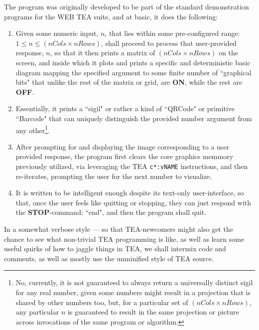 \documentclass[a4paper, 18pt]{book} %
\begin{document}
The program was originally developed to be part of the standard demonstration programs for the WEB TEA suite, and at basic, it does the following:

\begin{enumerate}
\item Given some numeric input, $n$, that lies within some pre-configured range: $1 \leq n \leq (nCols \times nRows)$, shall proceed to process that user-provided response, $n$, so that it then prints a matrix of $(nCols \times nRows)$ on the screen, and inside which it plots and prints a specific and deterministic basic diagram mapping the specified argument to some finite number of ``graphical bits" that unlike the rest of the matrix or grid, are \textbf{ON}, while the rest are \textbf{OFF}.
\item Essentially, it prints a ``sigil" or rather a kind of ``QRCode" or primitive ``Barcode" that can uniquely distinguish the provided number argument from any other\footnote{No, currently, it is not guaranteed to always return a universally distinct sigil for any real number, given some  numbers might result in a projection that is shared by other numbers too, but, for a particular set of $(nCols \times nRows)$, any particular $n$ is guaranteed to result in the same projection or picture across invocations of the same program or algorithm.}.
\item After prompting for and displaying the image corresponding to a user provided response, the program first clears the core graphics memmory previously utilized, via leveraging the TEA \texttt{c*:vNAME} instructions, and then re-iterates, prompting the user for the next number to visualize.
\item It is written to be intelligent enough despite its text-only user-interface, so that, once the user feels like quitting or stopping, they can just respond with the \textbf{STOP}-command; ``end", and then the program shall quit.
\end{enumerate}

In a somewhat verbose style --- so that TEA-newcomers might also get the chance to see what non-trivial TEA programming is like, as well as learn some useful quirks of how to jaggle things in TEA, we shall intermix code and comments, as well as mostly use the unminified style of TEA source.
\end{document}
